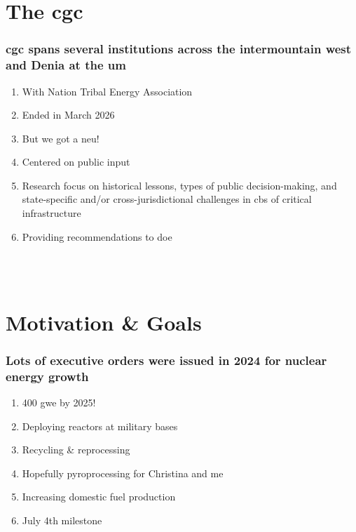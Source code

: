 \documentclass[aspectratio=1610,pdftex,dvipsnames,compress,xcolor={dvipsnames}]{beamer}
\newcommand{\acf}{\acrfull} %
\newcommand{\acl}{\acrlong} %
\newcommand{\acs}{\acrshort} %
\begin{document}
\section{The \acf{cgc}}


\addtocounter{framenumber}{-2} 
\begin{frame}
    \frametitle{\acs{cgc} spans several institutions across the intermountain west and Denia at the \acl{um}} 
    \begin{enumerate}%
        \item[]With Nation Tribal Energy Association
        \item[]Ended in March 2026
        \item[]But we got a \acs{neu}!
        \item[]Centered on public input
        \item[]Research focus on historical lessons, types of public decision-making, and state-specific and/or cross-jurisdictional challenges in \acl{cbs} of critical infrastructure
        \item[]Providing recommendations to \acs{doe}
    \end{enumerate}

    \vspace*{\fill}
    \textbf{\tiny\cite{ara26a}\tiny\hspace{0.05in}}\\
    \textbf{\tiny\cite{cfkoe25a}\tiny\hspace{0.05in}}\\
    \textbf{\tiny\cite{cfbor24a}\tiny\hspace{0.05in}}
\end{frame}


\section{Motivation \& Goals}


\addtocounter{framenumber}{-1} 
\begin{frame}
    \frametitle{Lots of executive orders were issued in 2024 for nuclear energy growth}
    \begin{enumerate}%
        \item[]400 \acs{gwe} by 2025!
        \item[]Deploying reactors at military bases
        \item[]Recycling \& reprocessing
        \item[]Hopefully pyroprocessing for Christina and me
        \item[]Increasing domestic fuel production
        \item[]July 4th milestone
    \end{enumerate}
\end{frame}
\end{document}
